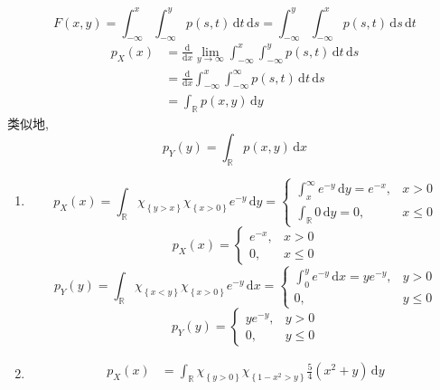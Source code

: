 \documentclass[../main.tex]{subfiles}
\begin{document}
\begin{solution}
    \[
        F\left( x,y \right)= \int_{-\infty}^{x}\int_{-\infty}^{y}p\left( s,t \right)\,\mathrm{d} t\,\mathrm{d} s= \int_{-\infty}^{y}\int_{-\infty}^{x}p\left( s,t \right)\,\mathrm{d} s\,\mathrm{d} t 
        \] \[
      \begin{aligned}
        p_{X}\left( x \right)&= \frac{\mathrm{d}}{\mathrm{d}x}\lim_{y\to \infty}\int_{-\infty}^{x}\int_{-\infty}^{y}p\left( s,t \right)\,\mathrm{d} t\,\mathrm{d} s\\ 
         &=  \frac{\mathrm{d}}{\mathrm{d}x}\int_{-\infty}^{x} \int_{-\infty}^{\infty}p\left( s,t \right)\,\mathrm{d} t\,\mathrm{d} s\\ 
          &=  \int_{\mathbb{R} }p\left( x,y \right)\,\mathrm{d} y
      \end{aligned}  
        \]类似地,  \[
        p_{Y}\left( y \right)= \int_{\mathbb{R} }p\left( x,y \right)\,\mathrm{d} x  
        \]
    \begin{enumerate}
        \item  \[
        p_{X}\left( x \right)= \int_{\mathbb{R} } \chi _{\left\{ y> x \right\}}\chi _{\left\{ x> 0 \right\}}e^{-y}\,\mathrm{d} y= \begin{cases} \int_{x}^{\infty}e^{-y}\,\mathrm{d} y= e^{-x},& x> 0\\ 
         \int_{\mathbb{R} }0\,\mathrm{d} y= 0,& x\le 0 \end{cases} 
        \] \[
        p_{X}\left( x \right)= \begin{cases} e^{-x},&x> 0\\ 
         0,&x\le 0 \end{cases}  
        \] \[
        p_{Y}\left( y \right)= \int_{\mathbb{R} }\chi _{\left\{ x< y \right\}}\chi _{\left\{ x> 0 \right\}}e^{-y}\,\mathrm{d} x= \begin{cases} \int_{0}^{y}e^{-y}\,\mathrm{d} x= ye^{-y},& y> 0\\ 
         0,& y\le 0 \end{cases} 
        \] \[
        p_{Y}\left( y \right)= \begin{cases} ye^{-y},& y> 0\\ 
         0,& y\le 0 \end{cases}  
        \]
         \item  \[
        \begin{aligned}
         p_{X}\left( x \right)&= \int_{\mathbb{R} }\chi _{\left\{ y> 0 \right\}}\chi _{\left\{ 1-x^{2}> y \right\}} \frac{5 }{4 }\left( x^{2}+ y \right)\,\mathrm{d} y \\ 

\end{aligned}\]
\end{enumerate}
\end{solution}
\end{document}
